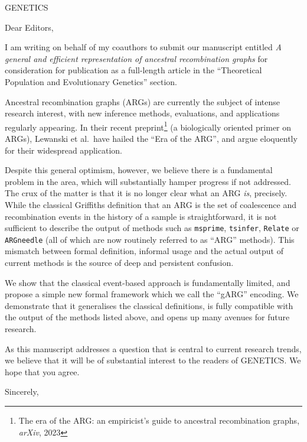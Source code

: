 \documentclass{letter}
\begin{document}
\begin{letter}{GENETICS}

\opening{Dear Editors,}

I am writing on behalf of my coauthors to submit our manuscript entitled
\emph{A general and efficient representation of ancestral recombination graphs}
for consideration for publication as a
full-length article in the
``Theoretical Population and Evolutionary Genetics'' section.

Ancestral recombination graphs (ARGs) are currently the subject of
intense research interest, with new inference methods, evaluations,
and applications regularly appearing.
In their recent preprint\footnote{The era of the ARG:
an empiricist’s guide to ancestral recombination graphs, \emph{arXiv}, 2023}
 (a biologically oriented primer
on ARGs), Lewanski et al.\ have hailed the ``Era of the ARG'', and
argue eloquently for their widespread application.

Despite this general optimism, however, we believe there is a
fundamental problem in the area, which will substantially hamper
progress if not addressed.
The crux of the matter is that it is no longer clear
what an ARG \emph{is}, precisely.
While the classical Griffiths definition that
an ARG is the set of coalescence and recombination events
in the history of a sample is straightforward,
it is not sufficient to describe the output of methods
such as \texttt{msprime}, \texttt{tsinfer}, \texttt{Relate}
or \texttt{ARGneedle} (all of which are now routinely
referred to as ``ARG'' methods). This mismatch
between formal definition, informal usage and the
actual output of current methods is the source of deep
and persistent confusion.

We show that the classical event-based approach is
fundamentally limited, and propose a simple new
formal framework which we call the ``gARG''
encoding. We demonstrate that it generalises
the classical definitions, is fully compatible
with the output of the methods listed above,
and opens up many avenues for future research.

As this manuscript addresses a question
that is central to current research trends,
we believe that it will be of substantial interest
to the readers of GENETICS. We hope that you agree.


\closing{Sincerely,}

\end{letter}
\end{document}
